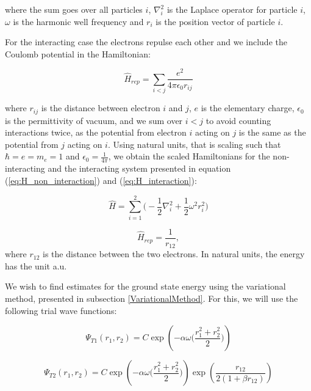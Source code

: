 \documentclass[norsk,a4paper,12pt]{article}
\begin{document}
where the sum goes over all particles $i$, $\nabla_i^2$ is the Laplace operator for particle $i$, $\omega$ is the harmonic well frequency and $r_i$ is the position vector of particle $i$. 

For the interacting case the electrons repulse each other and we include the Coulomb potential in the Hamiltonian:

\begin{equation}
    \hat{H}_{rep} = \sum_{i<j} \frac{e^2}{4\pi \epsilon_0 r_{ij}}
    \label{eq:H_interaction_unit}
\end{equation}

where $r_{ij}$ is the distance between electron $i$ and $j$, $e$ is the elementary charge, $\epsilon_ 0$ is the permittivity of vacuum, and we sum over $i < j$ to avoid counting interactions twice, as the potential from electron $i$ acting on $j$ is the same as the potential from $j$ acting on $i$. Using natural units, that is scaling such that $\hbar = e = m_e = 1$ and $\epsilon_0 = \frac{1}{4\pi}$, we obtain the scaled Hamiltonians for the non-interacting and the interacting system presented in equation (\ref{eq:H_non_interaction}) and (\ref{eq:H_interaction}):

\begin{equation}
    \hat{H} = \sum_{i=1}^{2} \bigg(-\frac{1}{2}\nabla_i^2 + \frac{1}{2} \omega^2r_i^2\bigg) 
    \label{eq:H_non_interaction}
\end{equation}

\begin{equation}
    \hat{H}_{rep} = \frac{1}{r_{12}},
    \label{eq:H_interaction}
\end{equation}
where $r_{12}$ is the distance between the two electrons. In natural units, the energy has the unit a.u.

We wish to find estimates for the ground state energy using the variational method, presented in subsection \ref{VariationalMethod}. For this, we will use the following trial wave functions:

\begin{equation}
    \Psi_{T1} (r_1, r_2) = C\exp(-\alpha \omega \Big(\frac{r_1^2 + r_2^2}{2}\Big))
    \label{eq:PsiT1}
\end{equation}

\begin{equation}
    \Psi_{T2}(r_1, r_2) = C\exp(-\alpha \omega \Big(\frac{r_1^2 + r_2^2}{2}\Big))\exp(\frac{r_{12}}{2(1+\beta r_{12})})
    \label{eq:PsiT2}
\end{equation}
\end{document}
